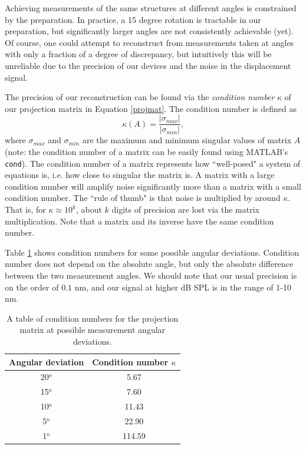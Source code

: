 \documentclass{article}
\begin{document}
\par{Achieving measurements of the same structures at different angles is constrained by the preparation. In practice, a 15 degree rotation is tractable in our preparation, but significantly larger angles are not consistently achievable (yet). Of course, one could attempt to reconstruct from measurements taken at angles with only a fraction of a degree of discrepancy, but intuitively this will be unreliable due to the precision of our devices and the noise in the displacement signal.}
\par{The precision of our reconstruction can be found via the \textit{condition number} $\kappa$ of our projection matrix in Equation \ref{projmat}. The condition number is defined as
	\begin{equation}
		\kappa (A) = \frac{|\sigma_{max}|}{|\sigma_{min}|},
	\end{equation}
	where $\sigma_{max}$ and $\sigma_{min}$ are the maximum and minimum singular values of matrix $A$(note: the condition number of a matrix can be easily found using MATLAB's \texttt{cond}). The condition number of a matrix represents how ``well-posed" a system of equations is, i.e. how close to singular the matrix is. A matrix with a large condition number will amplify noise significantly more than a matrix with a small condition number. The ``rule of thumb" is that noise is multiplied by around $\kappa$. That is, for $\kappa \approx 10^k$, about $k$ digits of precision are lost via the matrix multiplication. Note that a matrix and its inverse have the same condition number.
}
\par{Table \ref{kappas} shows condition numbers for some possible angular deviations. Condition number does not depend on the absolute angle, but only the absolute difference between the two measurement angles. We should note that our usual precision is on the order of $0.1$ nm, and our signal at higher dB SPL is in the range of 1-10 nm.}

\begin{table} 
\begin{center}
	\begin{tabular}{|c|c|}
		\hline
		Angular deviation & Condition number $\kappa$ \\
		\hline
		20$^\text{o}$ & 5.67\\
		15$^\text{o}$ & 7.60\\
		10$^\text{o}$ & 11.43\\
		5$^\text{o}$ & 22.90 \\
		1$^\text{o}$ & 114.59\\
		\hline
	\end{tabular}
	\caption{A table of condition numbers for the projection matrix at possible measurement angular deviations.}
\label{kappas}
\end{center}
\end{table}
\end{document}
